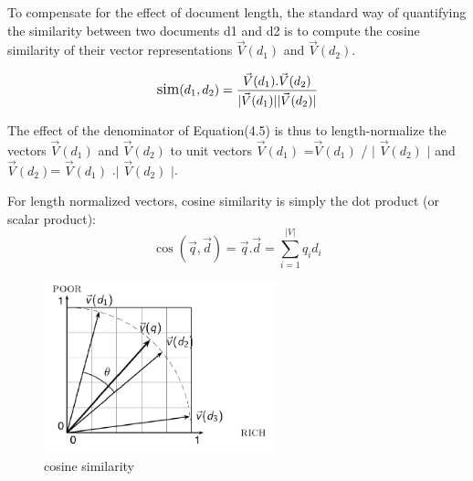 To compensate for the effect of document length, the standard way of
quantifying the similarity between two documents d1 and d2 is to compute
the cosine similarity of their vector representations 
$\vec{V}(d_1)$ and $\vec{V}(d_2)$.

\begin{equation}
    \large
         \text{sim}(d_1 ,d_2) \\
         =\frac{\vec{V}( d_1 ) . \vec{V}( d_2 ) } {|\vec{V}( d_1 )| |\vec{V}( d_2 )|}
\end{equation}


The effect of the denominator of Equation(4.5) is thus to length-normalize the vectors $\vec{V}(d_1)$ and $\vec{V}(d_2)$ 
to unit vectors  $\vec{V}(d_1)$  =$\vec{V}(d_1)$  / $|$ $\vec{V}(d_2)$ $|$ and  $\vec{V}(d_2)$= $\vec{V}(d_1)$ .$|$ $\vec{V}(d_2)$ $|$. 

For length normalized vectors, cosine similarity is simply the dot product (or scalar product):
\begin{equation}
    \cos{(\vec{q},\vec{d})} = \vec{q} .\vec{d} =\sum_{i=1}^{|V|} q_{i}  d_{i}
\end{equation}
\begin{figure}[H]%
    \center%
    \includegraphics[width=0.6\textwidth]{images/shimaa/cosine similarity.png}
    \caption[cosine similarity]{cosine similarity}\label{fig:cosine similarity}%
\end{figure}

